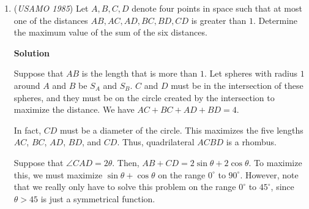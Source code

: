 \begin{enumerate}
 The first absolute value 
 \[\left |\frac{1}{2(10^5+10^5)}- \frac{1}{2(x_1+10^5)}\right | =\frac{|x_1- 10^5|}{2(10^5+10^5)(x_1+10^5)}<10^{-12}.\]

 The second absolute value 
 \begin{align*} &\left |\frac{\sqrt{1+4(10^5+1)}}{2(10^5+10^5)} - \frac{\sqrt{1+4(x_1+1)}}{2(x_1+10^5)} \right |\\ &\le \left |\frac{\sqrt{1+4(10^5+1)}}{2(10^5+10^5)}- \frac{\sqrt{1+4(x_1+1)}}{2(10^5+10^5)}\right |+\left |\frac{\sqrt{1+4(x_1+1)}}{2(10^5+10^5)}- \frac{\sqrt{1+4(x_1+1)}}{2(x_1+10^5)}\right |\\ &\le 10^{-7}+10^{-9}, \end{align*}
through a rationalized numerator.Therefore $|\tilde{x}_1-x_1|\le 10^{-6}.$

 For a real root $x_2$ with $x_2>10^5,$ we choose 
 \[\tilde{x}_2=10^5+\frac{1+\sqrt{1+4(10^5+1)}}{2(10^5+10^5)}.\]We can similarly prove it has the desired approximation.

 \textbf{Notes} Another round of iteration can increase the accuracy to more than 10 decimal places:
 \begin{align*} \tilde{x}_1^\prime=10^5+\frac{1-\sqrt{1+4(\tilde{x}_1+1)}}{2(\tilde{x}_1+10^5)},\\ \tilde{x}_2^\prime=10^5+\frac{1+\sqrt{1+4(\tilde{x}_2+1)}}{2(\tilde{x}_2+10^5)}. \end{align*}


 J.Z.

 


	\item (\textit{USAMO 1985}) Let $A,B,C,D$ denote four points in space such that at most one of the distances $AB,AC,AD,BC,BD,CD$ is greater than $1$. Determine the maximum value of the sum of the six distances.


 



\textbf{Solution}

Suppose that $AB$ is the length that is more than $1$. Let spheres with radius $1$ around $A$ and $B$ be $S_A$ and $S_B$. $C$ and $D$ must be in the intersection of these spheres, and they must be on the circle created by the intersection to maximize the distance. We have $AC + BC + AD + BD = 4$.

 In fact, $CD$ must be a diameter of the circle. This maximizes the five lengths $AC$, $BC$, $AD$, $BD$, and $CD$. Thus, quadrilateral $ACBD$ is a rhombus. 

 Suppose that $\angle CAD = 2\theta$. Then, $AB + CD = 2\sin{\theta} + 2\cos{\theta}$. To maximize this, we must maximize $\sin{\theta} + \cos{\theta}$ on the range $0^{\circ}$ to $90^{\circ}$. However, note that we really only have to solve this problem on the range $0^{\circ}$ to $45^{\circ}$, since $\theta > 45$ is just a symmetrical function.


\end{enumerate}
